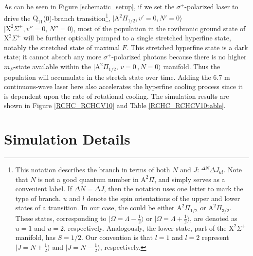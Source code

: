 \documentclass[twoside,twocolumn,9pt]{article}
\begin{document}
As can be seen in Figure \ref{schematic_setup}, if we set the $\sigma^+$-polarized laser to drive the $\mathrm{Q}_{11}$(0)-branch transition\footnote[2]{This notation describes the branch in terms of both $N$ and $J$: $^{\Delta N}\Delta J_{ul}$. Note that $N$ is not a good quantum number in $\mathrm{A}^2\Pi$, and simply serves as a convenient label. If $\Delta N = \Delta J$, then the notation uses one letter to mark the type of branch. $u$ and $l$ denote the spin orientations of the upper and lower states of a transition. In our case, the  could be either $\mathrm{A}^2\Pi_{1/2}$ or $\mathrm{A}^2\Pi_{3/2}$. These states, corresponding to $\lvert \Omega=\Lambda -\frac{1}{2} \rangle$ or $\lvert \Omega=\Lambda +\frac{1}{2} \rangle$, are denoted as $u=1$ and $u=2$, respectively. Analogously, the lower-state, part of the $\mathrm{X}^2 \Sigma^{+}$ manifold, has $S=1/2$. Our convention is that $l=1$ and $l=2$ represent $\lvert J=N+\frac{1}{2} \rangle$ and $\lvert J=N-\frac{1}{2} \rangle$, respectively.}, $\lvert \mathrm{A}^2\Pi_{1/2}, v'=0, N'=0\rangle$ \pp{--} $\lvert \mathrm{X}^2\Sigma^+, v''=0,\, N''=0\rangle$, most of the population in the rovibronic ground state of $\mathrm{X}^2 \Sigma^{+}$ will be further optically pumped to a single stretched hyperfine state, notably the stretched state of maximal $F$. This stretched hyperfine state is a dark state; it cannot absorb any more $\sigma^+$-polarized photons because there is no higher $m_F$-state available within the $\lvert \mathrm{A}^2\Pi_{1/2},\, v=0\,, N=0\rangle$ manifold. Thus the population will accumulate in the stretch state over time. Adding the 6.7 \si{\micro}m continuous-wave laser here also accelerates the hyperfine cooling process since it is dependent upon the rate of rotational cooling. The simulation results are shown in Figure \ref{RCHC_RCHCV10} and Table \ref{RCHC_RCHCV10table}.

\section{Simulation Details}
\end{document}
